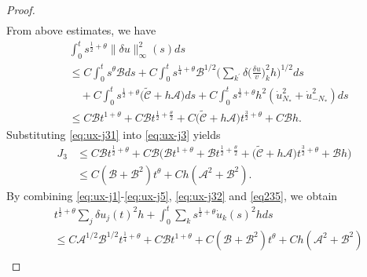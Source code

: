 \documentclass[a4paper,oneside,11pt]{article}
\numberwithin{equation}{section}
\begin{document}
\begin{proof}
\begin{equation}
\begin{aligned}
\end{aligned}	
\end{equation}
From above estimates, we have
\begin{equation}\label{eq:ux-j31}
\begin{aligned}
&\int_{0}^{t}s^{\frac12+\theta}\|\delta u\|_{\infty}^2(s)ds\\
&\leq C\int_{0}^{t}s^{\theta}\mathscr{B}ds+C\int_{0}^{t}s^{\frac14+\theta}\mathscr{B}^{1/2}\Big(\sum_{k^{\prime}}\delta\big(\frac{\delta u}{v}\big)_{k}^{2}h\Big)^{1/2}ds\\
&\quad+C\int_{0}^{t}s^{\frac12+\theta}\big(\tilde{\mathscr{C}}+ h\mathscr{A}\big)ds+C\int_{0}^{t}s^{\frac12+\theta}h^{2}(\dot{u}_{N_* }^{2}+\dot{u}_{-N_* }^{2})ds\\
&\leq C\mathscr{B}t^{1+\theta}+C\mathscr{B}t^{\frac12+\frac\theta 2}+C\big(\tilde{\mathscr{C}}+ h\mathscr{A}\big)t^{\frac32+\theta}+C\mathscr{B}h.
\end{aligned}	
\end{equation}
Substituting \eqref{eq:ux-j31} into \eqref{eq:ux-j3} yields
\begin{equation}\label{eq:ux-j32}
\begin{aligned}
J_3&\leq  C\mathscr{B}t^{\frac{1}{2}+\theta}+C\mathscr{B}\Big(\mathscr{B}t^{1+\theta}+\mathscr{B}t^{\frac12+\frac\theta 2}+\big(\tilde{\mathscr{C}}+ h\mathscr{A}\big)t^{\frac32+\theta}+\mathscr{B}h\Big)\\
&\leq  C(\mathscr{B}+\mathscr{B}^2)t^{\theta}+C h(\mathscr{A}^2+\mathscr{B}^2).
\end{aligned}	
\end{equation}
By combining \eqref{eq:ux-j1}-\eqref{eq:ux-j5}, \eqref{eq:ux-j32} and \eqref{eq235}, we obtain
\begin{equation}\label{eq236}\begin{aligned}
&t^{\frac{1}{2}+\theta}\sum_{j}\delta u_{j}(t)^{2}h+\int_{0}^{t}\sum_{k}s^{\frac{1}{2}+\theta}\dot{u}_{k}(s)^{2}hds \\
&\leq C\mathscr{A}^{1/2}\mathscr{B}^{1/2}t^{\frac{1}{4}+\theta}+C\mathscr{B}t^{1+\theta}+C(\mathscr{B}+\mathscr{B}^2)t^{\theta}+C h(\mathscr{A}^2+\mathscr{B}^2)\\

\end{aligned}
\end{equation}
\end{proof}
\end{document}
